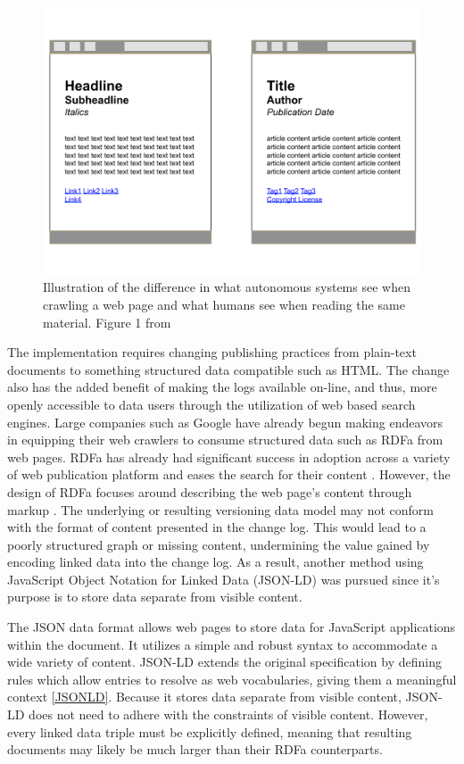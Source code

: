 \begin{figure}
	\centering
	\includegraphics[scale=0.40]{figures/RDFaSemantics.png}
	\caption{Illustration of the difference in what autonomous systems see when crawling a web page and what humans see when reading the same material. Figure 1 from \cite{Herman2015}}
	\label{RDFa}
\end{figure}

The implementation requires changing publishing practices from plain-text documents to something structured data compatible such as HTML.
The change also has the added benefit of making the logs available on-line, and thus, more openly accessible to data users through the utilization of web based search engines.
Large companies such as Google have already begun making endeavors in equipping their web crawlers to consume structured data such as RDFa from web pages.
RDFa has already had significant success in adoption across a variety of web publication platform and eases the search for their content \cite{Bizer2013}.
However, the design of RDFa focuses around describing the web page's content through markup \cite{Herman2015}.
The underlying or resulting versioning data model may not conform with the format of content presented in the change log.
This would lead to a poorly structured graph or missing content, undermining the value gained by encoding linked data into the change log.
As a result, another method using JavaScript Object Notation for Linked Data (JSON-LD) was pursued since it's purpose is to store data separate from visible content.

The JSON data format allows web pages to store data for JavaScript applications within the document.
It utilizes a simple and robust syntax to accommodate a wide variety of content.
JSON-LD extends the original specification by defining rules which allow entries to resolve as web vocabularies, giving them a meaningful context \ref{JSONLD}.
Because it stores data separate from visible content, JSON-LD does not need to adhere with the constraints of visible content.
However, every linked data triple must be explicitly defined, meaning that resulting documents may likely be much larger than their RDFa counterparts.

